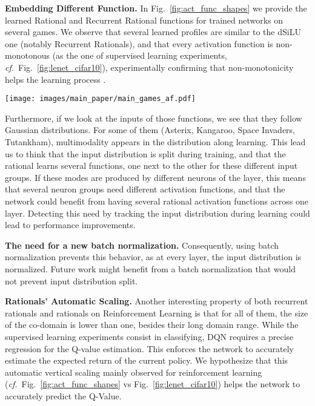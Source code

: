 \documentclass{article}
\newcommand{\cf}{\emph{cf.}~}
\begin{document}
\textbf{Embedding Different Function.}
In Fig.~\ref{fig:act_func_shapes} we provide the learned Rational and Recurrent Rational functions for trained networks on several games. We observe that several learned profiles are similar to the dSiLU one (notably Recurrent Rationals), and that every activation function is non-monotonous (as the one of supervised learning experiments, \cf Fig.~\ref{fig:lenet_cifar10}), experimentally confirming that non-monotonicity helps the learning process \cite{Misra20}.

\begin{figure*}[t]
\centering
\texttt{[image: images/main\_paper/main\_games\_af.pdf]}
\caption{Learned rational activation functions of Reinforcement Learning Agents automatically reduced their co-domains. Several input distribution has converged to multimodal Gaussians (e.g. Asterix, Space Invaders and Tutankham). (Left) activation functions at the successive layers in Rational Networks. As for supervised learning, several desired properties (as nonmoncity and bounded negative domains are also learned by these parametric functions). (Right) Common activation function of every layer in a Recurrent Rational Network. A Figure with parametric functions for every games is provided in the appendix.}
\label{fig:act_func_shapes}
\end{figure*}

Furthermore, if we look at the inputs of those functions, we see that they follow Gaussian distributions. For some of them (Asterix, Kangaroo, Space Invaders, Tutankham), multimodality appears in the distribution along learning. This lead us to think that the input distribution is split during training, and that the rational learns several functions, one next to the other for these different input groups. If these modes are produced by different neurons of the layer, this means that several neuron groups need different activation functions, and that the network could benefit from having several rational activation functions across one layer. Detecting this need by tracking the input distribution during learning could lead to performance improvements. 

\textbf{The need for a new batch normalization.}
Consequently, using batch normalization prevents this behavior, as at every layer, the input distribution is normalized. Future work might benefit from a batch normalization that would not prevent input distribution split.

\textbf{Rationals' Automatic Scaling.}
Another interesting property of both recurrent rationals and rationals on Reinforcement Learning is that for all of them, the size of the co-domain is lower than one, besides their long domain range. While the supervised learning experiments consist in classifying, DQN requires a precise regression for the Q-value estimation. This enforces the network to accurately estimate the expected return of the current policy. We hypothesize that this automatic vertical scaling mainly observed for reinforcement learning (\cf Fig.~\ref{fig:act_func_shapes} vs Fig.~\ref{fig:lenet_cifar10}) helps the network to accurately predict the Q-Value.
\end{document}
